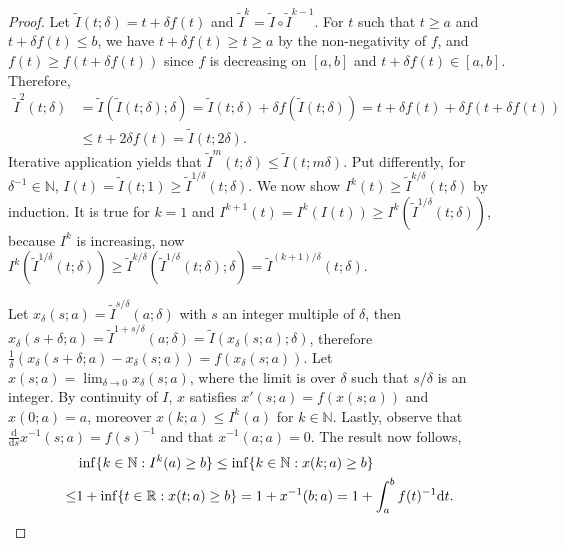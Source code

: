 \documentclass[11pt,a4paper]{article}
\numberwithin{equation}{section}
\begin{document}
\begin{proof}
    Let $\tilde{I}(t;\delta)=t+\delta f(t)$ and $\tilde{I}^k=\tilde{I}\circ \tilde{I}^{k-1}$. For $t$ such that $t\ge a$ and $t+\delta f(t)\le b$, we have $t+\delta f(t)\ge t\ge a$ by the non-negativity of $f$, and $f(t)\ge f(t+\delta f(t))$ since $f$ is decreasing on $[a,b]$ and $t+\delta f(t)\in[a,b]$. Therefore,
    \begin{align*}
        \tilde{I}^2(t;\delta)&=\tilde{I}(\tilde{I}(t;\delta);\delta)=\tilde{I}(t;\delta)+\delta f(\tilde{I}(t;\delta))=t+\delta f(t)+\delta f(t+\delta f(t))\\
        &\le t+2\delta f(t)=\tilde{I}(t;2\delta).
    \end{align*}    
    Iterative application yields that $\tilde{I}^m(t;\delta)\le \tilde{I}(t;m\delta)$. Put differently, for $\delta^{-1}\in\mathbb{N}$, $I(t)=\tilde{I}(t;1)\ge\tilde{I}^{1/\delta}(t;\delta)$. We now show $I^k(t)\ge \tilde{I}^{k/\delta}(t;\delta)$ by induction. It is true for $k=1$ and $I^{k+1}(t)=I^k(I(t))\ge I^k(\tilde{I}^{1/\delta}(t;\delta))$, because $I^k$ is increasing, now $I^k(\tilde{I}^{1/\delta}(t;\delta))\ge \tilde{I}^{k/\delta}(\tilde{I}^{1/\delta}(t;\delta);\delta)=\tilde{I}^{(k+1)/\delta}(t;\delta)$.
    
    Let $x_\delta(s;a)=\tilde{I}^{s/\delta}(a;\delta)$ with $s$ an integer multiple of $\delta$, then
    $x_\delta(s+\delta;a)=\tilde{I}^{1+s/\delta}(a;\delta)=\tilde{I}(x_\delta(s;a);\delta)$, therefore $\frac{1}{\delta}(x_\delta(s+\delta;a)-x_\delta(s;a))=f(x_\delta(s;a))$. Let $x(s;a)=\lim_{\delta\to 0}x_\delta(s;a)$, where the limit is over $\delta$ such that $s/\delta$ is an integer. By continuity of $I$, $x$ satisfies $x'(s;a)=f(x(s;a))$ and $x(0;a)=a$, moreover $x(k;a)\le I^k(a)$ for $k\in\mathbb{N}$. 
    Lastly, observe that $\frac{\mathrm{d}}{\mathrm{d}s}x^{-1}(s;a)=f(s)^{-1}$ and that $x^{-1}(a;a)=0$. The result now follows,
    \begin{align*}
        &\inf\{k\in\mathbb{N} : I^k(a)\ge b\}\le \inf\{k\in\mathbb{N} : x(k;a)\ge b\}\\
        \le&1+\inf\{t\in\mathbb{R} : x(t;a)\ge b\}= 1 + x^{-1}(b;a)= 1 + \int_a^bf(t)^{-1}\mathrm{d}t. \qedhere
    \end{align*}
\end{proof}
\end{document}
